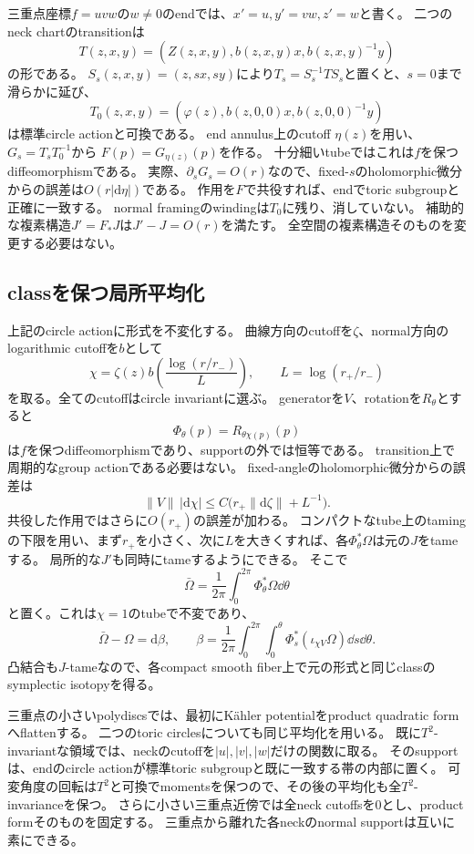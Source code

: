三重点座標$f=uvw$の$w\ne0$のendでは、$x'=u,y'=vw,z'=w$と書く。
二つのneck chartのtransitionは
\[
T(z,x,y)=(Z(z,x,y),b(z,x,y)x,b(z,x,y)^{-1}y)
\]
の形である。
$S_s(z,x,y)=(z,sx,sy)$により$T_s=S_s^{-1}TS_s$と置くと、$s=0$まで滑らかに延び、
\[
T_0(z,x,y)=(\varphi(z),b(z,0,0)x,b(z,0,0)^{-1}y)
\]
は標準circle actionと可換である。
end annulus上のcutoff $\eta(z)$を用い、$G_s=T_sT_0^{-1}$から
$F(p)=G_{\eta(z)}(p)$を作る。
十分細いtubeではこれは$f$を保つdiffeomorphismである。
実際、$\partial_sG_s=O(r)$なので、fixed-$s$のholomorphic微分からの誤差は$O(r|\mathrm d\eta|)$である。
作用を$F$で共役すれば、endでtoric subgroupと正確に一致する。
normal framingのwindingは$T_0$に残り、消していない。
補助的な複素構造$J'=F_*J$は$J'-J=O(r)$を満たす。
全空間の複素構造そのものを変更する必要はない。

\subsection{classを保つ局所平均化}\label{neck:averaging}
上記のcircle actionに形式を不変化する。
曲線方向のcutoffを$\zeta$、normal方向のlogarithmic cutoffを$b$として
\[
\chi=\zeta(z)b\left(\frac{\log(r/r_-)}{L}\right),\qquad
L=\log(r_+/r_-)
\]
を取る。全てのcutoffはcircle invariantに選ぶ。
generatorを$V$、rotationを$R_\theta$とすると
\[
\Phi_\theta(p)=R_{\theta\chi(p)}(p)
\]
は$f$を保つdiffeomorphismであり、supportの外では恒等である。
transition上で周期的なgroup actionである必要はない。
fixed-angleのholomorphic微分からの誤差は
\[
\|V\|\,|\mathrm d\chi|
\le C\bigl(r_+\|\mathrm d\zeta\|+L^{-1}\bigr).
\]
共役した作用ではさらに$O(r_+)$の誤差が加わる。
コンパクトなtube上のtamingの下限を用い、まず$r_+$を小さく、次に$L$を大きくすれば、各$\Phi_\theta^*\Omega$は元の$J$をtameする。
局所的な$J'$も同時にtameするようにできる。
そこで
\begin{equation}\label{neck:average}
\bar\Omega=\frac1{2\pi}\int_0^{2\pi}\Phi_\theta^*\Omega\dd\theta
\end{equation}
と置く。これは$\chi=1$のtubeで不変であり、
\[
\bar\Omega-\Omega=\mathrm d\beta,\qquad
\beta=\frac1{2\pi}\int_0^{2\pi}\int_0^\theta
\Phi_s^*(\iota_{\chi V}\Omega)\dd s\dd\theta.
\]
凸結合も$J$-tameなので、各compact smooth fiber上で元の形式と同じclassのsymplectic isotopyを得る。

三重点の小さいpolydiscsでは、最初にKähler potentialをproduct quadratic formへflattenする。
二つのtoric circlesについても同じ平均化を用いる。
既に$T^2$-invariantな領域では、neckのcutoffを$|u|,|v|,|w|$だけの関数に取る。
そのsupportは、endのcircle actionが標準toric subgroupと既に一致する帯の内部に置く。
可変角度の回転は$T^2$と可換でmomentsを保つので、その後の平均化も全$T^2$-invarianceを保つ。
さらに小さい三重点近傍では全neck cutoffsを0とし、product formそのものを固定する。
三重点から離れた各neckのnormal supportは互いに素にできる。

